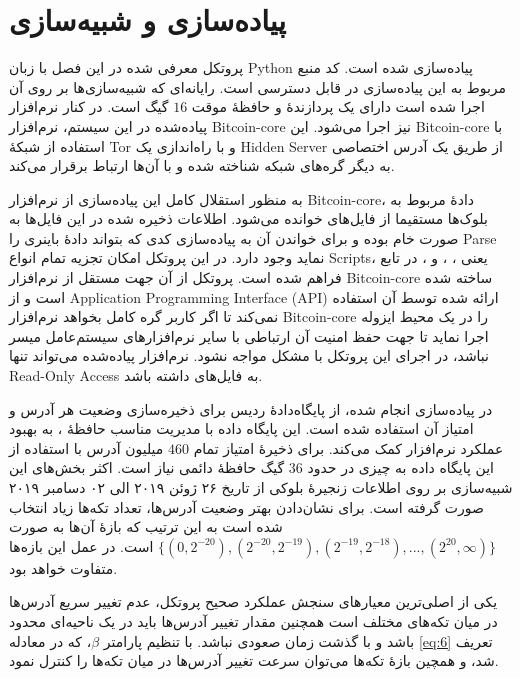 \section{پیاده‌سازی و شبیه‌سازی}
\label{subsubsection:4.3.4}


پروتکل معرفی شده در این فصل با زبان 
\gls{Python}
پیاده‌سازی شده است. کد منبع مربوط به این پیاده‌سازی در \cite{Badakhshan} قابل دسترسی است.  رایانه‌ای که شبیه‌سازی‌ها بر روی آن اجرا شده است دارای یک پردازندهٔ
و حافظهٔ موقت 
$16$
گیگ  است. در کنار نرم‌افزار پیاده‌شده در این سیستم، نرم‌افزار 
\gls{Bitcoin-core}
نیز اجرا می‌شود. این
\gls{Bitcoin-core}
با استفاده از شبکهٔ
\gls{Tor}
و با راه‌اندازی یک 
\gls{Hidden Server}
از طریق یک آدرس  اختصاصی به دیگر گره‌های شبکه شناخته شده و با آن‌ها ارتباط برقرار می‌کند.

به منظور استقلال کامل این پیاده‌سازی از نرم‌افزار
\gls{Bitcoin-core}،
دادهٔ مربوط به بلوک‌ها مستقیما از فایل‌های  خوانده می‌شود. اطلاعات ذخیره شده در این فایل‌ها به صورت خام بوده و برای خواندن آن به پیاده‌سازی کدی که بتواند دادهٔ باینری را 
\gls{Parse}
نماید وجود دارد. در این پروتکل امکان تجزیه تمام انواع 
\glspl{Script}،
یعنی 
، ، و ،
در تابع  فراهم شده است. پروتکل از آن جهت مستقل از نرم‌افزار 
\gls{Bitcoin-core}
ساخته شده است و از 
\gls{Application Programming Interface (API)}
ارائه شده توسط آن استفاده نمی‌کند تا اگر کاربر گره کامل بخواهد نرم‌افزار 
\gls{Bitcoin-core}
را در یک محیط ایزوله اجرا نماید تا جهت حفظ امنیت آن ارتباطی با سایر نرم‌افزار‌های سیستم‌عامل میسر نباشد، در اجرای این پروتکل با مشکل مواجه نشود. نرم‌افزار پیاده‌شده می‌تواند تنها 
\gls{Read-Only Access}
به فایل‌های   داشته باشد.

در پیاده‌سازی انجام شده، از پایگاه‌دادهٔ 
ردیس
برای ذخیره‌سازی وضعیت هر آدرس و امتیاز آن استفاده شده است. این پایگاه داده با مدیریت مناسب حافظهٔ ، به بهبود عملکرد نرم‌افزار کمک می‌کند. برای ذخیرهٔ امتیاز تمام $460$ میلیون آدرس با استفاده از این پایگاه داده به چیزی در حدود $36$ گیگ حافظهٔ دائمی نیاز است. اکثر بخش‌های این شبیه‌سازی بر روی اطلاعات زنجیرهٔ بلوکی از تاریخ ۲۶ ژوئن ۲۰۱۹ الی ۰۲ دسامبر ۲۰۱۹ صورت گرفته است. برای نشان‌دادن بهتر وضعیت آدرس‌ها،  تعداد تکه‌ها زیاد‌ انتخاب شده است به این ترتیب که بازهٔ آن‌ها به صورت
$\{(0,2^{-20}), (2^{-20}, 2^{-19}), (2^{-19}, 2^{-18}), ..., (2^{20}, \infty)\}$ 
است. در عمل این بازه‌ها متفاوت خواهد بود.


یکی از اصلی‌ترین معیار‌های سنجش عملکرد صحیح پروتکل، عدم تغییر سریع آدرس‌ها در میان تکه‌های مختلف است همچنین مقدار تغییر آدرس‌ها باید در یک ناحیه‌ای محدود باشد و با گذشت زمان صعودی نباشد. با تنظیم پارامتر $\beta$، که در معادله \eqref{eq:6} تعریف شد، و همچین بازه‌ٔ تکه‌ها می‌توان سرعت تغییر آدرس‌ها در میان تکه‌ها را کنترل نمود. 

